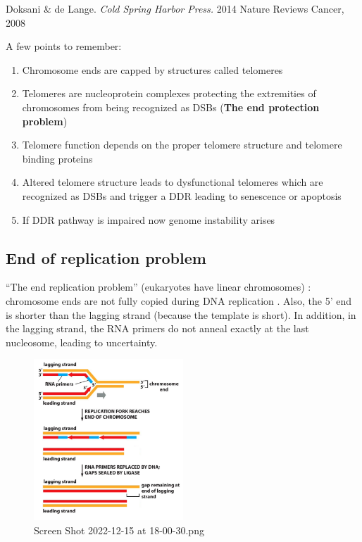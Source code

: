 Doksani \& de Lange. \emph{Cold Spring Harbor Press.} 2014 Nature
Reviews Cancer, 2008

A few points to remember:

\begin{enumerate}
\def\labelenumi{\arabic{enumi}.}
\tightlist
\item
  Chromosome ends are capped by structures called telomeres
\item
  Telomeres are nucleoprotein complexes protecting the extremities of
  chromosomes from being recognized as DSBs (\textbf{The end protection
  problem})
\item
  Telomere function depends on the proper telomere structure and
  telomere binding proteins
\item
  Altered telomere structure leads to dysfunctional telomeres which are
  recognized as DSBs and trigger a DDR leading to senescence or
  apoptosis
\item
  If DDR pathway is impaired now genome instability arises
\end{enumerate}

\hypertarget{end-of-replication-problem}{%
\subsection{End of replication
problem}\label{end-of-replication-problem}}

``The end replication problem'' (eukaryotes have linear chromosomes) :
chromosome ends are not fully copied during DNA replication . Also, the
5' end is shorter than the lagging strand (because the template is
short). In addition, in the lagging strand, the RNA primers do not
anneal exactly at the last nucleosome, leading to uncertainty.

\begin{figure}
\centering
\includegraphics[width=0.5\textwidth]{../_resources/Screen_Shot_2022-12-15_at_18-00-30.png}
\caption{Screen Shot 2022-12-15 at 18-00-30.png}
\end{figure}

